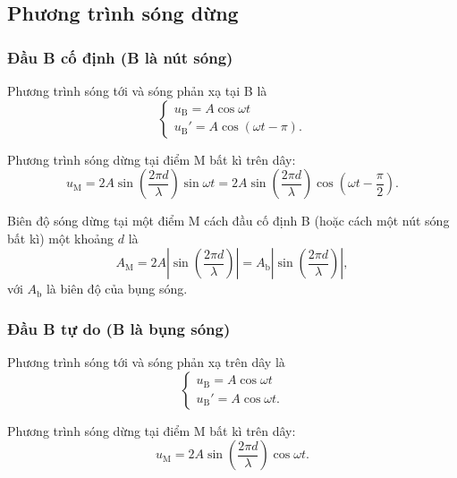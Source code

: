 \subsection{Phương trình sóng dừng}
\subsubsection{Đầu B cố định (B là nút sóng)}

Phương trình sóng tới và sóng phản xạ tại B là
\begin{equation*}
	\begin{cases}
		u_\text{B}=A\cos \omega t \\ 
		u_\text{B}'=A\cos (\omega t-\pi).
	\end{cases}
\end{equation*}

Phương trình sóng dừng tại điểm M bất kì trên dây:
\begin{equation*}
	u_\text{M}=2A\sin\left( \dfrac{2\pi d}{\lambda}\right) \sin\omega t = 2A\sin\left( \dfrac{2\pi d}{\lambda}\right) \cos\left( \omega t - \dfrac{\pi}{2}\right). 
\end{equation*}

Biên độ sóng dừng tại một điểm M cách đầu cố định B (hoặc cách một nút sóng bất kì) một khoảng $d$ là
\begin{equation*}
	A_\text{M}=2A\left|\sin\left( \dfrac{2\pi d}{\lambda}\right)\right| = A_\text{b}\left|\sin\left( \dfrac{2\pi d}{\lambda}\right)\right|,
\end{equation*}
với $A_\text{b}$ là biên độ của bụng sóng.

\subsubsection{Đầu B tự do (B là bụng sóng)}

Phương trình sóng tới và sóng phản xạ trên dây là
\begin{equation*}
	\begin{cases}
		u_\text{B}=A\cos \omega t \\ 
		u_\text{B}'=A\cos \omega t.
	\end{cases}
\end{equation*}

Phương trình sóng dừng tại điểm M bất kì trên dây:
\begin{equation*}
	u_\text{M}=2A\sin\left( \dfrac{2\pi d}{\lambda}\right) \cos\omega t. 
\end{equation*}

